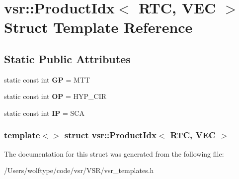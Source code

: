 \hypertarget{structvsr_1_1_product_idx_3_01_r_t_c_00_01_v_e_c_01_4}{\section{vsr\-:\-:Product\-Idx$<$ R\-T\-C, V\-E\-C $>$ Struct Template Reference}
\label{structvsr_1_1_product_idx_3_01_r_t_c_00_01_v_e_c_01_4}
}
\subsection*{Static Public Attributes}
\begin{DoxyCompactItemize}
\item 
\hypertarget{structvsr_1_1_product_idx_3_01_r_t_c_00_01_v_e_c_01_4_adbbbed3837184a238742e2dc9ae0a910}{static const int {\bfseries G\-P} = M\-T\-T}\label{structvsr_1_1_product_idx_3_01_r_t_c_00_01_v_e_c_01_4_adbbbed3837184a238742e2dc9ae0a910}

\item 
\hypertarget{structvsr_1_1_product_idx_3_01_r_t_c_00_01_v_e_c_01_4_abc7ef979430feeb9c1df4db91deecd51}{static const int {\bfseries O\-P} = H\-Y\-P\-\_\-\-C\-I\-R}\label{structvsr_1_1_product_idx_3_01_r_t_c_00_01_v_e_c_01_4_abc7ef979430feeb9c1df4db91deecd51}

\item 
\hypertarget{structvsr_1_1_product_idx_3_01_r_t_c_00_01_v_e_c_01_4_a3d78bbc12b97d59ebe37e44460c9e42b}{static const int {\bfseries I\-P} = S\-C\-A}\label{structvsr_1_1_product_idx_3_01_r_t_c_00_01_v_e_c_01_4_a3d78bbc12b97d59ebe37e44460c9e42b}

\end{DoxyCompactItemize}
\subsubsection*{template$<$$>$ struct vsr\-::\-Product\-Idx$<$ R\-T\-C, V\-E\-C $>$}



The documentation for this struct was generated from the following file\-:\begin{DoxyCompactItemize}
\item 
/\-Users/wolftype/code/vsr/\-V\-S\-R/vsr\-\_\-templates.\-h\end{DoxyCompactItemize}
